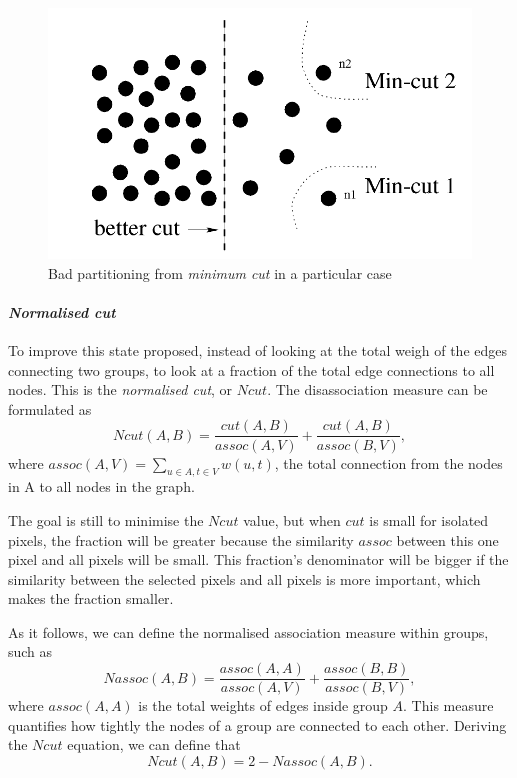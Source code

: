 \documentclass[]{article}
\begin{document}
\begin{figure}[!htbp]
 \centering
  \includegraphics[width=\textwidth]{img/mincutproblem.png}
 \caption{Bad partitioning from \textit{minimum cut} in a particular case \cite{shi_normalized_2000}}
\end{figure}

\paragraph{\textit{Normalised cut}}
To improve this state \cite{shi_normalized_2000} proposed, instead of looking at the total weigh of the edges connecting two groups, to look at a fraction of the total edge connections to all nodes.
This is the \textit{normalised cut}, or \(Ncut\).
The disassociation measure can be formulated as
\[Ncut(A, B) = \frac{cut(A, B)}{assoc(A, V)} + \frac{cut(A, B)}{assoc(B, V)},\]
where \(assoc(A, V) = \sum_{u\in A, t\in V} w(u, t)\), the total connection from the nodes in A to all nodes in the graph.

The goal is still to minimise the \(Ncut\) value, but when \(cut\) is small for isolated pixels, the fraction will be greater because the similarity \(assoc\) between this one pixel and all pixels will be small.
This fraction's denominator will be bigger if the similarity between the selected pixels and all pixels is more important, which makes the fraction smaller.

As it follows, we can define the normalised association measure within groups, such as
\[Nassoc(A, B) = \frac{assoc(A, A)}{assoc(A,V)} + \frac{assoc(B, B)}{assoc(B, V)},\]
where \(assoc(A, A)\) is the total weights of edges inside group \(A\).
This measure quantifies how tightly the nodes of a group are connected to each other.
Deriving the \(Ncut\) equation, we can define that
\[Ncut(A, B) = 2 - Nassoc(A, B).\]
\end{document}
